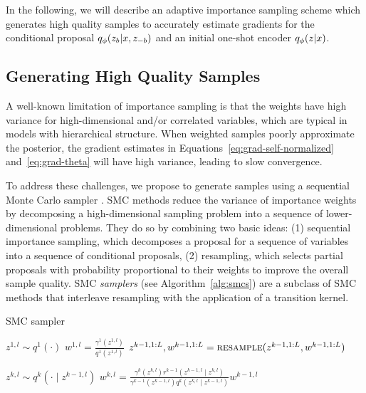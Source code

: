 \documentclass{article}
\theoremstyle{definition}
\begin{document}
In the following, we will describe an adaptive importance sampling scheme which generates high quality samples to accurately estimate gradients for the conditional proposal $q_\phi(z_b | x, z_{-b})$ and an initial one-shot encoder $q_\phi(z | x)$.

\subsection{Generating High Quality Samples}

A well-known limitation of importance sampling is that the weights have high variance for high-dimensional and/or correlated variables, which are typical in models with hierarchical structure. When weighted samples poorly approximate the posterior, the gradient estimates in Equations~\ref{eq:grad-self-normalized} and~\ref{eq:grad-theta} will have high variance, leading to slow convergence.


To address these challenges, we propose to generate samples using a sequential Monte Carlo sampler \citep{delmoral2006sequential}.
SMC methods \cite{doucet2001sequential} reduce the variance of importance weights by decomposing a high-dimensional sampling problem into a sequence of lower-dimensional problems. They do so by combining two basic ideas: (1) sequential importance sampling, which decomposes a proposal for a sequence of variables into a sequence of conditional proposals, (2) resampling, which selects partial proposals with probability proportional to their weights to improve the overall sample quality. 
SMC \emph{samplers} (see  Algorithm~\ref{alg:smcs}) are a subclass of SMC methods that interleave resampling with the application of a transition kernel.

\begin{algorithm}[!t]
  \caption{SMC sampler}
  \label{alg:smcs}
\begin{algorithmic}[1]
    \small
        \State $z^{1,l} \sim q^1(\cdot)$
        \State $w^{1,l} = \frac{\gamma^1(z^{1,l})}{q^1(z^{1,l})}$
    \EndFor
      \State$z^{k-1,1:L}, w^{k-1,1:L}=\textsc{resample}(z^{k-1,1:L}, w^{k-1,1:L})$

          \State $z^{k,l} \sim q^k(\cdot \mid z^{k-1,l})$\label{line:apg-propose}
          \State $w^{k,l} = \frac{\gamma^k(z^{k,l}) r^{k-1}(z^{k-1,l} \mid z^{k,l})}{\gamma^{k-1}(z^{k-1,l}) q^k(z^{k,l} \mid z^{k-1,l})}w^{k-1,l}$
      \EndFor
    \EndFor
\end{algorithmic}
\end{algorithm}
\end{document}

